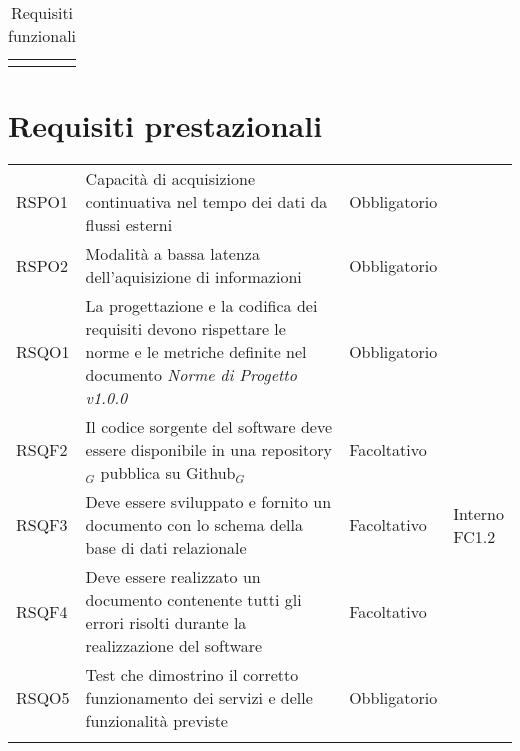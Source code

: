 {\begin{center}
\begin{longtable}{|p{3cm}|p{4cm}|p{4cm}|p{4cm}|}
			\rowcolor{white}
			
			\caption[Requisiti funzionali]{Requisiti funzionali}\label{4.1}\\
	\end{longtable}%
	
\end{center}

\section{Requisiti prestazionali}\label{RequisitiPrestazionali}
\def\tabularxcolumn#1{m{#1}}
{
	
	\begin{center}
		\renewcommand{\arraystretch}{1.4}
		\begin{longtable}{|p{4cm}|p{4cm}|p{4cm}|p{3cm}|}
		\hline
		\rowcolor{airforceblue}
		\makecell[c]{\textbf{Codice RS}} & \makecell[c]{\textbf{Descrizione}} & \makecell[c]{\textbf{Tipo di requisito}} & \makecell[c]{\textbf{Fonte}} \\
		\hline
		RSPO1 & Capacità di acquisizione continuativa nel tempo dei dati da flussi esterni & Obbligatorio & \makecell[c]{Capitolato}  \\
		\hline
		RSPO2 & Modalità a bassa latenza dell'aquisizione di informazioni & Obbligatorio & \makecell[c]{Capitolato} \\
		\hline
		RSQO1  & La progettazione e la codifica dei requisiti devono rispettare le norme e le metriche definite nel documento \textit{Norme di Progetto v1.0.0}& Obbligatorio & \makecell[c]{Interno} \\
		\hline
		RSQF2  & Il codice sorgente del software deve essere disponibile in una repository$_G$ pubblica su Github$_G$  & Facoltativo & \makecell[c]{Interno} \\
		\hline
		RSQF3  & Deve essere sviluppato e fornito un documento con lo schema della base di dati relazionale  & Facoltativo & \makecell[c]{Interno \\ FC1.2} \\
		\hline
		RSQF4  & Deve essere realizzato un documento contenente tutti gli errori risolti durante la realizzazione del software & Facoltativo & \makecell[c]{Interno} \\
		\hline
		RSQO5  & Test che dimostrino il corretto funzionamento dei servizi e delle funzionalità previste  & Obbligatorio & \makecell[c]{Capitolato} \\
		\hline
		\rowcolor{white}
		

\end{longtable}
\end{center}}}
